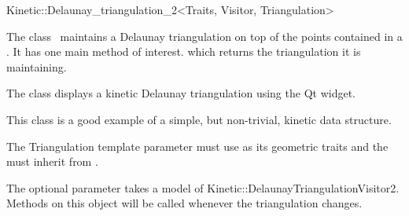 

\begin{ccRefClass}{Kinetic::Delaunay_triangulation_2<Traits, Visitor, Triangulation>}  %


\ccDefinition
  
The class \ccRefName\ maintains a Delaunay triangulation on top of the
points contained in a . It has one main method
of interest.  which returns the triangulation it
is maintaining. 

The class  displays a kinetic Delaunay
triangulation using the Qt widget.

This class is a good example of a simple, but non-trivial, kinetic
data structure.

The Triangulation template parameter must use
 as its geometric traits and the
 must inherit from .

The optional  parameter takes a model of
Kinetic::DelaunayTriangulationVisitor2. Methods on this object will be called
whenever the triangulation changes.


\ccIsModel



\ccTypes


\ccCreation
{}  %


\end{ccRefClass}
